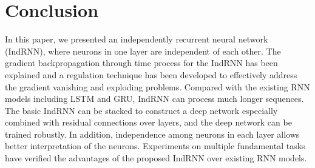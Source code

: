 \documentclass[10pt,twocolumn,letterpaper]{article}
\begin{document}
\section{Conclusion}
In this paper, we presented an independently recurrent neural network (IndRNN), where neurons in one layer are independent of each other. The gradient backpropagation through time process for the IndRNN has been explained and a regulation technique has been developed to effectively address the gradient vanishing and exploding problems. Compared with the existing RNN models including LSTM and GRU, IndRNN can process much longer sequences. The basic IndRNN can be stacked to construct a deep network especially combined with residual connections over layers, and the deep network can be trained robustly. In addition, independence among neurons in each layer allows better interpretation of the neurons. Experiments on multiple fundamental tasks have verified the advantages of the proposed IndRNN over existing RNN models. 

{\small


}
\end{document}
